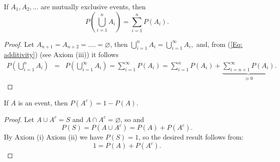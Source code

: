 \documentclass[notes=show,handout]{beamer}\usepackage[]{graphicx}\usepackage[]{color}
\newcommand{\bea}{\begin{eqnarray}}
\newcommand{\eea}{\end{eqnarray}}
\newcommand{\nn}{\nonumber}
\begin{document}
\begin{frame}{\secname}
  \begin{theorem}
  If $A_1, A_2,...$ are mutually exclusive events, then
  \begin{equation}
  P\left(  \bigcup_{i=1}^{n} A_i \right) = \sum_{i=1}^{n} P(A_i).  \label{Eq: ProbUnionDisj}
  \end{equation}
  \end{theorem} %

  \pause

  \begin{footnotesize}
  \begin{proof}
  Let $A_{n+1}=A_{n+2}=....=\varnothing$, then
  $
  \bigcup_{i=1}^{n} A_i = \bigcup_{i=1}^{\infty} A_i,
  $
  and, from (\ref{Eq: additivity}) (see Axiom (iii)) it follows
  \bea
  P\left(  \bigcup_{i=1}^{n} A_i \right) &=& P\left(  \bigcup_{i=1}^{\infty} A_i \right)
  = \sum_{i=1}^{\infty} P(A_i) = \sum_{i=1}^{n} P(A_i) + \underbrace{\sum_{i=n+1}^{\infty} P(A_i)}_{\equiv 0}. \nn
  \eea
  \end{proof}
  \end{footnotesize}
\end{frame}

\begin{frame}{\secname}
  \begin{theorem}
  If $A$ is an event, then
  $
  P(  A^c ) = 1- P(A).
  $
  \end{theorem} \vspace{0.1cm}


  \begin{footnotesize}
  \begin{proof}
  Let $A \cup A^c =S$ and $A \cap A^c = \varnothing$, so
  and
  $$
  P( S ) = P\left(A \cup A^c \right) =P(A) + P\left(A^c \right). \nn
  $$
  By Axiom (i) Axiom (ii) we have $P(S)=1$, so the desired result follows from:
  $$
  1 = P(A) + P\left(A^c \right).
  $$
  \end{proof}
  \end{footnotesize}
\end{frame}


%
%
%
\end{document}
